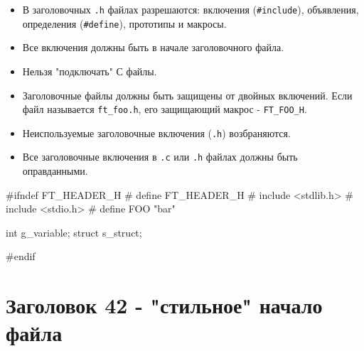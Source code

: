 \documentclass{42-ru}
\begin{document}
        \begin{itemize}

            \item В заголовочных \texttt{.h} файлах разрешаются: включения (\texttt{#include}), объявления, определения (\texttt{#define}), прототипы и макросы.

            \item Все включения должны быть в начале заголовочного файла.

            \item Нельзя "подключать" С файлы.

            \item Заголовочные файлы должны быть защищены от двойных включений. Если файл называется \texttt{ft\_foo.h}, его защищающий макрос - \texttt{FT\_FOO\_H}.

            \item Неиспользуемые заголовочные включения (\texttt{.h}) возбраняются.

            \item Все заголовочные включения в \texttt{.c} или \texttt{.h} файлах должны быть оправданными.

        \end{itemize}

        \begin{42ccode}
#ifndef FT_HEADER_H
# define FT_HEADER_H
# include <stdlib.h>
# include <stdio.h>
# define FOO "bar"

int		g_variable;
struct	s_struct;

#endif
        \end{42ccode}

    \newpage


   \section{Заголовок 42 - "стильное" начало файла}
\end{document}

